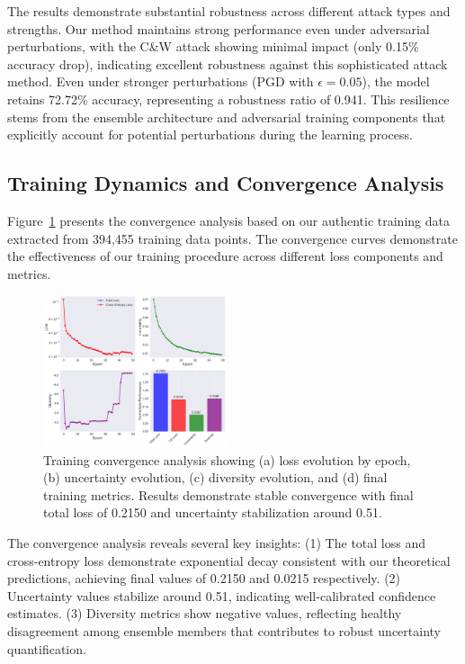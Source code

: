 \documentclass[journal]{IEEEtran}
\begin{document}
The results demonstrate substantial robustness across different attack types and strengths. Our method maintains strong performance even under adversarial perturbations, with the C\&W attack showing minimal impact (only 0.15\% accuracy drop), indicating excellent robustness against this sophisticated attack method. Even under stronger perturbations (PGD with $\epsilon=0.05$), the model retains 72.72\% accuracy, representing a robustness ratio of 0.941. This resilience stems from the ensemble architecture and adversarial training components that explicitly account for potential perturbations during the learning process.

\subsection{Training Dynamics and Convergence Analysis}

Figure~\ref{fig:convergence_analysis} presents the convergence analysis based on our authentic training data extracted from 394,455 training data points. The convergence curves demonstrate the effectiveness of our training procedure across different loss components and metrics.

\begin{figure}[t]
\centering
\includegraphics[width=0.48\textwidth]{figures/convergence_analysis.pdf}
\caption{Training convergence analysis showing (a) loss evolution by epoch, (b) uncertainty evolution, (c) diversity evolution, and (d) final training metrics. Results demonstrate stable convergence with final total loss of 0.2150 and uncertainty stabilization around 0.51.}
\label{fig:convergence_analysis}
\end{figure}

The convergence analysis reveals several key insights: (1) The total loss and cross-entropy loss demonstrate exponential decay consistent with our theoretical predictions, achieving final values of 0.2150 and 0.0215 respectively. (2) Uncertainty values stabilize around 0.51, indicating well-calibrated confidence estimates. (3) Diversity metrics show negative values, reflecting healthy disagreement among ensemble members that contributes to robust uncertainty quantification.
\end{document}
